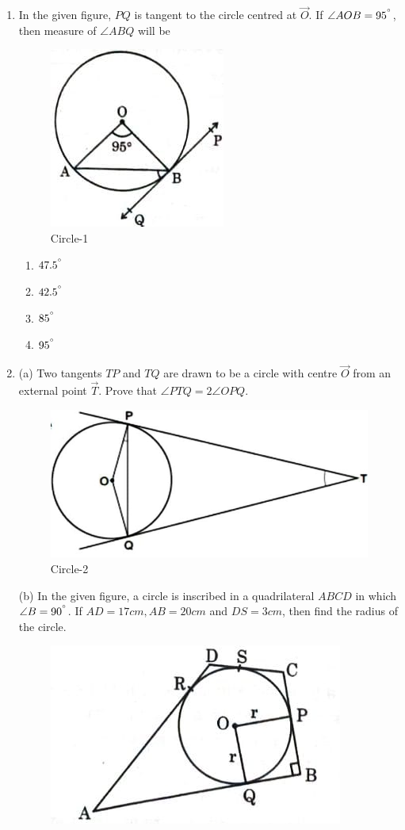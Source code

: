 \documentclass{article}
\begin{document}
\begin{enumerate}
	\item In the given figure, $ PQ $ is tangent to the circle centred at $ \vec{O} $. If $ \angle{AOB} = 95^{\degree} $, then measure of $ \angle{ABQ} $ will be
	\begin{figure}[h!]
		\centering
		\includegraphics[width=0.3\columnwidth]{fig1.jpg}
		\caption{Circle-1}
		\label{fig:circle}
	\end{figure}
		\begin{enumerate}
			\item $ 47.5^{\degree} $
			\item $ 42.5^{\degree} $
			\item $ 85^{\degree} $
			\item $ 95^{\degree} $
		\end{enumerate}
	\item (a) Two tangents $ TP $ and $ TQ $ are drawn to be a circle with centre $ \vec{O} $ from an external point $ \vec{T} $. Prove that $ \angle{PTQ} = 2\angle{OPQ} $.
		\begin{figure}[H]
			\centering
			\includegraphics[width=0.5\columnwidth]{fig2.jpg}
			\caption{Circle-2}
			\label{fig:circle}
		\end{figure}
	 (b) In the given figure, a circle is inscribed in a quadrilateral $ ABCD $ in which $ \angle{B} = 90^{\degree} $. If $ AD = 17 cm, AB = 20 cm $ and $ DS = 3cm $, then find the radius of the circle.
		\begin{figure}[h!]
			\centering 
			\includegraphics[width=0.5\columnwidth]{fig3.jpg}

\end{figure}
\end{enumerate}
\end{document}
